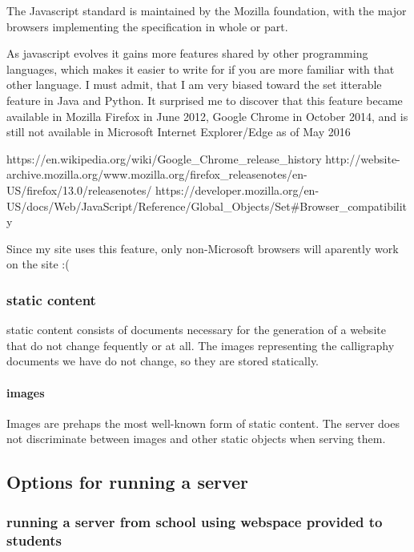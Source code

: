 The Javascript standard is maintained by the Mozilla foundation, with the major browsers implementing the specification in whole or part.

As javascript evolves it gains more features shared by other programming languages, which makes it easier to write for if you are more familiar with that other language.  I must admit, that I am very biased toward the set itterable feature in Java and Python.  It surprised me to discover that this feature became available in Mozilla Firefox in June 2012, Google Chrome in October 2014, and is still not available in Microsoft Internet Explorer/Edge as of May 2016

https://en.wikipedia.org/wiki/Google\_Chrome\_release\_history
http://website-archive.mozilla.org/www.mozilla.org/firefox\_releasenotes/en-US/firefox/13.0/releasenotes/
https://developer.mozilla.org/en-US/docs/Web/JavaScript/Reference/Global\_Objects/Set\#Browser\_compatibility

Since my site uses this feature, only non-Microsoft browsers will aparently work on the site :(




\subsubsection{static content}

static content consists of documents necessary for the generation of a website that do not change fequently or at all.  The images representing the calligraphy documents we have do not change, so they are stored statically.

\paragraph{images}

Images are prehaps the most well-known form of static content.  The server does not discriminate between images and other static objects when serving them.



\subsection{Options for running a server}

\subsubsection{running a server from school using webspace provided to students}

